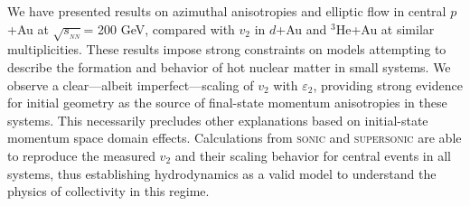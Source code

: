 \documentclass[%
reprint,
showpacs,preprintnumbers,
 amsmath,amssymb,
 aps,
]{revtex4-1}
\newcommand{\sqsn}{\mbox{$\sqrt{s_{_{NN}}}$}\xspace}
\newcommand{\dau}{\mbox{$d$+Au}\xspace}
\newcommand{\pau}{\mbox{$p$+Au}\xspace}
\newcommand{\hau}{\mbox{$^3\text{He}$+Au}\xspace}
\begin{document}
We have presented results on azimuthal anisotropies and elliptic flow in central \pau at \sqsn = 200 GeV, compared with $v_2$ in \dau and \hau at similar multiplicities. These results impose strong constraints on models attempting to describe the formation and behavior of hot nuclear matter in small systems. We observe a clear---albeit imperfect---scaling of $v_2$ with $\varepsilon_2$, providing strong evidence for initial geometry as the source of final-state momentum anisotropies in these systems. This necessarily precludes other explanations based on initial-state momentum space domain effects. Calculations from \textsc{sonic} and \textsc{supersonic} are able to reproduce the measured $v_2$ and their scaling behavior for central events in all systems, thus establishing hydrodynamics as a valid model to understand the physics of collectivity in this regime. 


\end{document}
